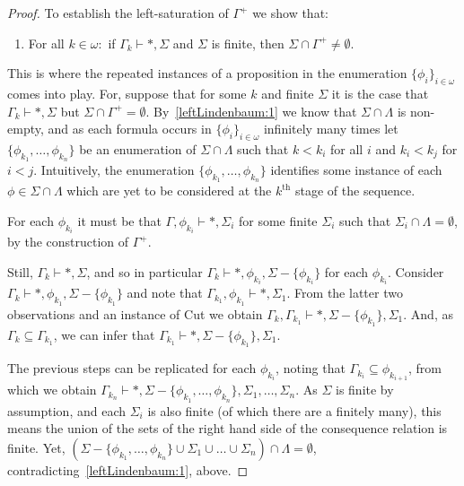 \documentclass[10pt]{article}
\begin{document}
\begin{lemma}
\begin{proof}
    To establish the left-saturation of \(\Gamma^{+}\) we show that:
    \begin{enumerate}[label=(\arabic*),resume]
    \item\label{leftLindenbaum:2} For all \(k \in \omega \colon\) if \(\Gamma_{k} \vdash \ast, \Sigma\) and \(\Sigma\) is finite, then \(\Sigma \cap \Gamma^{+} \ne \emptyset\).
    \end{enumerate}

    This is where the repeated instances of a proposition in the enumeration \(\{\phi_{i}\}_{i \in \omega}\) comes into play.
    For, suppose that for some \(k\) and finite \(\Sigma\) it is the case that \(\Gamma_{k} \vdash \ast, \Sigma\) but \(\Sigma \cap \Gamma^{+} = \emptyset\).
    By~\ref{leftLindenbaum:1} we know that \(\Sigma \cap \Lambda\) is non-empty, and as each formula occurs in \(\{\phi_{i}\}_{i \in \omega}\) infinitely many times let \(\{\phi_{k_{1}}, \dots, \phi_{k_{n}}\}\) be an enumeration of \(\Sigma \cap \Lambda\) such that \(k < k_{i}\) for all \(i\) and \(k_{i} < k_{j}\) for \(i < j\).
    Intuitively, the enumeration \(\{\phi_{k_{1}}, \dots, \phi_{k_{n}}\}\) identifies some instance of each \(\phi \in \Sigma \cap \Lambda\) which are yet to be considered at the \(k^{\text{th}}\) stage of the sequence.

    For each \(\phi_{k_{i}}\) it must be that \mbox{\(\Gamma, \phi_{k_{i}} \vdash \ast, \Sigma_{i}\)} for some finite \(\Sigma_{i}\) such that \(\Sigma_{i} \cap \Lambda = \emptyset\), by the construction of \(\Gamma^{+}\).

    Still, \mbox{\(\Gamma_{k} \vdash \ast, \Sigma\)}, and so in particular \mbox{\(\Gamma_{k} \vdash \ast, \phi_{k_{i}},\Sigma - \{\phi_{k_{i}}\}\)} for each \(\phi_{k_{i}}\).
    Consider \mbox{\(\Gamma_{k} \vdash \ast, \phi_{k_{1}},\Sigma - \{\phi_{k_{1}}\}\)} and note that \mbox{\(\Gamma_{k_{1}}, \phi_{k_{1}} \vdash \ast, \Sigma_{1}\)}.
    From the latter two observations and an instance of Cut we obtain \mbox{\(\Gamma_{k}, \Gamma_{k_{1}} \vdash \ast, \Sigma - \{\phi_{k_{1}}\}, \Sigma_{1}\)}.
    And, as \mbox{\(\Gamma_{k} \subseteq \Gamma_{k_{1}}\)}, we can infer that \mbox{\(\Gamma_{k_{1}} \vdash \ast, \Sigma - \{\phi_{k_{1}}\}, \Sigma_{1}\)}.

    The previous steps can be replicated for each \(\phi_{k_{i}}\), noting that \(\Gamma_{k_{i}} \subseteq \phi_{k_{i+1}}\), from which we obtain \mbox{\(\Gamma_{k_{n}} \vdash \ast, \Sigma - \{\phi_{k_{1}},\dots,\phi_{k_{n}}\}, \Sigma_{1},\dots,\Sigma_{n}\)}.
    As \(\Sigma\) is finite by assumption, and each \(\Sigma_{i}\) is also finite (of which there are a finitely many), this means the union of the sets of the right hand side of the consequence relation is finite.
    Yet, \((\Sigma - \{\phi_{k_{1}},\dots,\phi_{k_{n}}\} \cup \Sigma_{1} \cup \dots \cup \Sigma_{n}) \cap \Lambda = \emptyset\), contradicting~\ref{leftLindenbaum:1}, above.


\end{proof}
\end{lemma}
\end{document}
